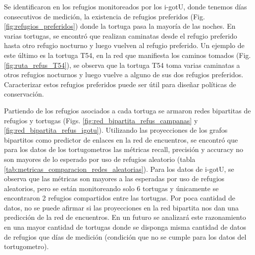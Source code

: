 Se identificaron en los refugios monitoreados por los i-gotU, donde tenemos días consecutivos de medición, la existencia de refugios preferidos (Fig. \ref{fig:refugios_preferidos}) donde la tortuga pasa la mayoría de las noches. En varias tortugas, se encontró que realizan caminatas desde el refugio preferido hasta otro refugio nocturno y luego vuelven al refugio preferido. Un ejemplo de este último es la tortuga T54, en la red que manifiesta los caminos tomados (Fig. \ref{fig:ruta_refus_T54}), se observa que la tortuga T54 toma varias caminatas a otros refugios nocturnos y luego vuelve a alguno de sus dos refugios preferidos. Caracterizar estos refugios preferidos puede ser útil para diseñar políticas de conservación.
 
Partiendo de los refugios asociados a cada tortuga se armaron redes bipartitas de refugios y tortugas (Figs. \ref{fig:red_bipartita_refus_campanas} y \ref{fig:red_bipartita_refus_igotu}). Utilizando las proyecciones de los grafos bipartitos como predictor de enlaces en la red de encuentros, se encontró que para los datos de los tortugometros las métricas recall, precisión y accuracy no son mayores de lo esperado por uso de refugios aleatorio (tabla \ref{tab:metricas_comparacion_redes_aleatorias}). Para los datos de i-gotU, se observa que las métricas son mayores a las esperadas por uso de refugios aleatorios, pero se están monitoreando solo 6 tortugas y únicamente se encontraron 2 refugios compartidos entre las tortugas. Por poca cantidad de datos, no se puede afirmar si las proyecciones en la red bipartita nos dan una predicción de la red de encuentros. En un futuro se analizará este razonamiento en una mayor cantidad de tortugas donde se disponga misma cantidad de datos de refugios que días de medición (condición que no se cumple para los datos del tortugometro).
 
 
 
 
 
 
 
 
 
 
 

